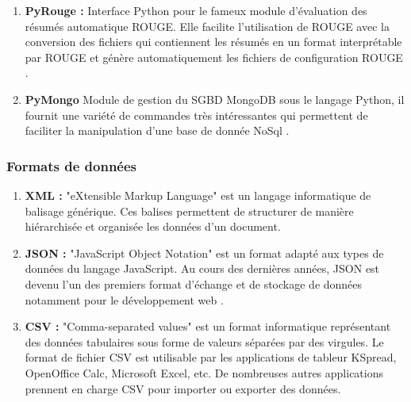 \begin{enumerate}[leftmargin=*]
                \item{\textbf{PyRouge : }}
                Interface Python pour le fameux module d'évaluation des résumés automatique ROUGE. Elle facilite l'utilisation de ROUGE avec la conversion des fichiers qui contiennent les résumés en un format interprétable par ROUGE et génère automatiquement les fichiers de configuration ROUGE \cite{pyrouge}.\\

                \item{\textbf{PyMongo}}
                Module de gestion du SGBD MongoDB sous le langage Python, il fournit une variété de commandes très intéressantes qui permettent de faciliter la manipulation d'une base de donnée NoSql \cite{pymongo}.\\
            \end{enumerate}

        \subsubsection{Formats de données}
            \begin{enumerate}[leftmargin=*]
                \item{\textbf{XML : }}
                "eXtensible Markup Language" est un langage informatique de balisage générique. Ces balises permettent de structurer de manière hiérarchisée et organisée les données d'un document.\\

                \item{\textbf{JSON : }}
                "JavaScript Object Notation" est un format adapté aux types de données du langage JavaScript. Au cours des dernières années, JSON est devenu l'un des premiers format d'échange et de stockage de données notamment pour le développement web \cite{jsonimpl}.\\
                
                \item{\textbf{CSV : }}
                "Comma-separated values" est un format informatique représentant des données tabulaires sous forme de valeurs séparées par des virgules. Le format de fichier CSV est utilisable par les applications de tableur KSpread, OpenOffice Calc, Microsoft Excel, etc. De nombreuses autres applications prennent en charge CSV pour importer ou exporter des données.\cite{csv}
            \end{enumerate}

